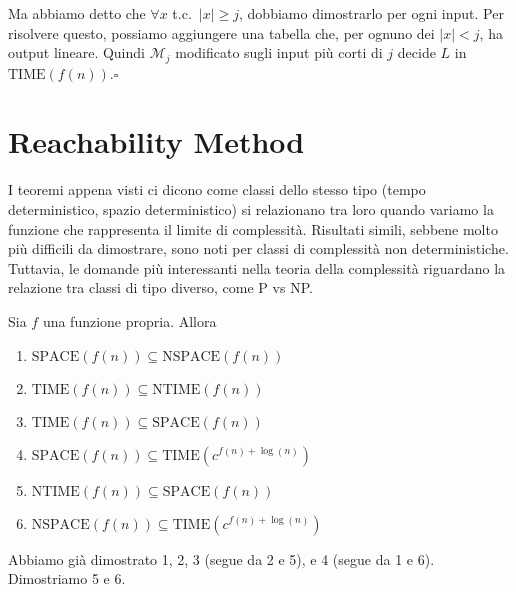 Ma abbiamo detto che $\forall x$ t.c.~$|x|\geq j$, dobbiamo dimostrarlo per ogni input. Per risolvere questo, possiamo aggiungere una tabella che, per ognuno dei $|x|<j$, ha output lineare. Quindi $\mathcal{M}_j$ modificato sugli input più corti di $j$ decide $L$ in $\text{TIME}(f(n))$.\hfill $\square$\medskip



\section{Reachability Method}\label{sec:reachability}
I teoremi appena visti ci dicono come classi dello stesso tipo (tempo deterministico, spazio deterministico) si relazionano tra loro quando variamo la funzione che rappresenta il limite di complessità. Risultati simili, sebbene molto più difficili da dimostrare, sono noti per classi di complessità non deterministiche. Tuttavia, le domande più interessanti nella teoria della complessità riguardano la relazione tra classi di tipo diverso, come P vs NP.
\begin{theorem}[Reachability]
    Sia $f$ una funzione propria. Allora
    \begin{enumerate}
        \item $\text{SPACE}(f(n))\subseteq\text{NSPACE}(f(n))$
        \item $\text{TIME}(f(n))\subseteq\text{NTIME}(f(n))$
        \item $\text{TIME}(f(n))\subseteq\text{SPACE}(f(n))$
        \item $\text{SPACE}(f(n))\subseteq\text{TIME}(c^{f(n)+\log(n)})$
        \item $\text{NTIME}(f(n))\subseteq\text{SPACE}(f(n))$
        \item $\text{NSPACE}(f(n))\subseteq\text{TIME}(c^{f(n)+\log(n)})$
    \end{enumerate}
\end{theorem}
Abbiamo già dimostrato 1, 2, 3 (segue da 2 e 5), e 4 (segue da 1 e 6). Dimostriamo 5 e 6.

